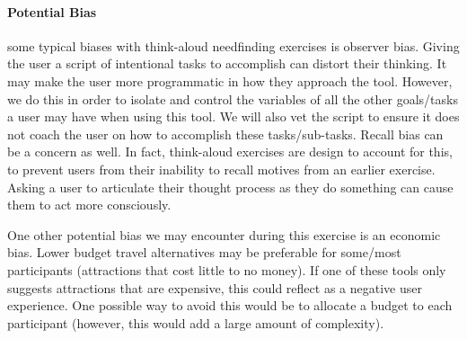 \paragraph{Potential Bias} some typical biases with think-aloud needfinding exercises is observer bias. Giving the user a script of intentional tasks to accomplish can distort their thinking. It may make the user more programmatic in how they approach the tool. However, we do this in order to isolate and control the variables of all the other goals/tasks a user may have when using this tool. We will also vet the script to ensure it does not coach the user on how to accomplish these tasks/sub-tasks. Recall bias can be a concern as well. In fact, think-aloud exercises are design to account for this, to prevent users from their inability to recall motives from an earlier exercise. Asking a user to articulate their thought process as they do something can cause them to act more consciously.

One other potential bias we may encounter during this exercise is an economic bias. Lower budget travel alternatives may be preferable for some/most participants (attractions that cost little to no money). If one of these tools only suggests attractions that are expensive, this could reflect as a negative user experience. One possible way to avoid this would be to allocate a budget to each participant (however, this would add a large amount of complexity).


